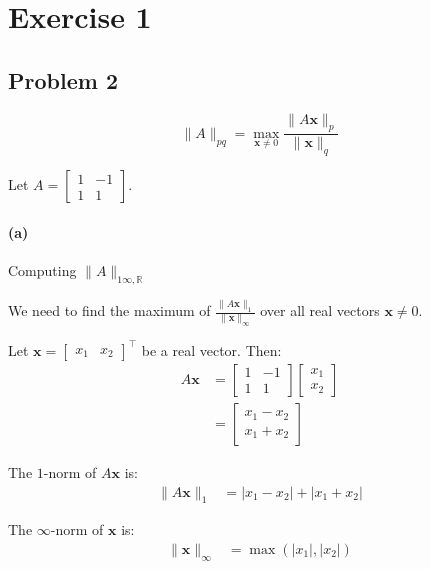 \section{Exercise 1}

\subsection{Problem 2}

\begin{equation}
    \|A\|_{pq} = \max_{\mathbf{x} \neq 0} \frac{\|A\mathbf{x}\|_p}{\|\mathbf{x}\|_q}
\end{equation}

Let $A = \begin{bmatrix} 1 & -1 \\ 1 & 1 \end{bmatrix}$.

\paragraph{(a)} Computing $\|A\|_{1\infty,\mathbb{R}}$

We need to find the maximum of $\frac{\|A\mathbf{x}\|_1}{\|\mathbf{x}\|_\infty}$ over all real vectors $\mathbf{x} \neq 0$.

Let $\mathbf{x} = \begin{bmatrix} x_1 & x_2 \end{bmatrix}^\top$ be a real vector. Then:
\begin{align*}
    A\mathbf{x} & = \begin{bmatrix} 1 & -1 \\ 1 & 1 \end{bmatrix} \begin{bmatrix} x_1 \\ x_2 \end{bmatrix} \\
                & = \begin{bmatrix} x_1 - x_2 \\ x_1 + x_2 \end{bmatrix}
\end{align*}

The $1$-norm of $A\mathbf{x}$ is:
\begin{align*}
    \|A\mathbf{x}\|_1 & = |x_1 - x_2| + |x_1 + x_2|
\end{align*}

The $\infty$-norm of $\mathbf{x}$ is:
\begin{align*}
    \|\mathbf{x}\|_\infty & = \max(|x_1|, |x_2|)
\end{align*}

